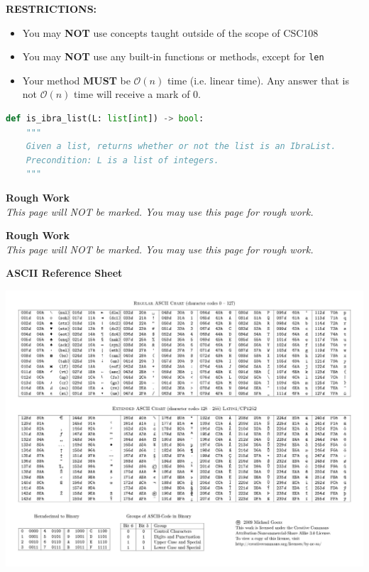 \documentclass[letterpaper,13pt,addpoints]{exam}
\begin{document}
\begin{questions}
\begin{center}
    \textbf{RESTRICTIONS:}
    \begin{itemize}
        \item You may \textbf{NOT} use concepts taught outside of the scope of CSC108
        \item You may \textbf{NOT} use any built-in functions or methods, except for
              \texttt{len}
        \item Your method \textbf{MUST} be $\mathcal{O}(n)$ time (i.e. linear time). Any
              answer that is not $\mathcal{O}(n)$ time will receive a mark of 0.
    \end{itemize}
    \begin{lstlisting}[language=Python, style=mystyle]
def is_ibra_list(L: list[int]) -> bool:
    """
    Given a list, returns whether or not the list is an IbraList.
    Precondition: L is a list of integers.
    """
\end{lstlisting}
\end{center}
\end{questions}

\clearpage
\begin{center}
    \textbf{Rough Work}\\
    \textit{This page will NOT be marked. You may use this page for rough work.}
\end{center}

\clearpage
\begin{center}
    \textbf{Rough Work}\\
    \textit{This page will NOT be marked. You may use this page for rough work.}
\end{center}
\clearpage
\begin{center}
    \textbf{ASCII Reference Sheet}

    \includegraphics[width=0.8\textheight, angle=270]{ascii.jpg}
\end{center}
\end{document}
